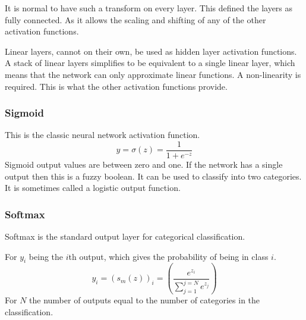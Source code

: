 \documentclass[12pt,parskip]{komatufte}\right
\begin{document}
It is normal to have such a transform on every layer.
This defined the layers as fully connected.
As it allows the scaling and shifting of any of the other activation functions.


Linear layers, cannot on their own, be used as hidden layer activation functions.
A stack of linear layers simplifies to be equivalent to a single linear layer, which means that the network can only approximate linear functions.
A non-linearity is required.
This is what the other activation functions provide.


\subsubsection{Sigmoid}


This is the classic neural network activation function.
\begin{equation}
y=\sigma(z)=\frac{1}{1+e^{-z}}
\end{equation}
Sigmoid output values are between zero and one.
If the network has a single output then this is a fuzzy boolean.
It can be used to classify into two categories.
It is sometimes called a logistic output function.

\subsubsection{Softmax}

Softmax is the standard output layer for categorical classification.

For $y_i$ being the $i$th output, which gives the probability of being in class $i$.
\begin{equation}
y_i=\left(s_m(z)\right)_i=\left( \frac{e^{z_i}}{\sum_{j=1}^{j=N} e^{z_j}} \right)
\end{equation}
For $N$ the number of outputs equal to the number of categories in the classification.
\end{document}
